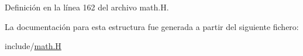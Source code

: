 Definición en la línea 162 del archivo math.\+H.



La documentación para esta estructura fue generada a partir del siguiente fichero\+:\begin{DoxyCompactItemize}
\item 
include/\hyperlink{math_8_h}{math.\+H}\end{DoxyCompactItemize}
